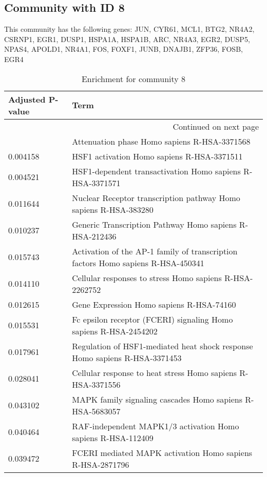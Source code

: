 \subsection*{Community with ID 8}
This community has the following genes: JUN, CYR61, MCL1, BTG2, NR4A2, CSRNP1, EGR1, DUSP1, HSPA1A, HSPA1B, ARC, NR4A3, EGR2, DUSP5, NPAS4, APOLD1, NR4A1, FOS, FOXF1, JUNB, DNAJB1, ZFP36, FOSB, EGR4
\\
\begin{longtable}{p{2.4cm}p{14.5cm}}
\caption{Enrichment for community 8}\\
\toprule
Adjusted \newline P-value &                                                                              Term \\
\midrule
\endhead
\midrule
\multicolumn{2}{r}{{Continued on next page}} \\
\midrule
\endfoot

\bottomrule
\endlastfoot
                 0.005931 &                                      Attenuation phase Homo sapiens R-HSA-3371568 \\
                 0.004158 &                                        HSF1 activation Homo sapiens R-HSA-3371511 \\
                 0.004521 &                         HSF1-dependent transactivation Homo sapiens R-HSA-3371571 \\
                 0.011644 &                  Nuclear Receptor transcription pathway Homo sapiens R-HSA-383280 \\
                 0.010237 &                           Generic Transcription Pathway Homo sapiens R-HSA-212436 \\
                 0.015743 &  Activation of the AP-1 family of transcription factors Homo sapiens R-HSA-450341 \\
                 0.014110 &                           Cellular responses to stress Homo sapiens R-HSA-2262752 \\
                 0.012615 &                                          Gene Expression Homo sapiens R-HSA-74160 \\
                 0.015531 &                  Fc epsilon receptor (FCERI) signaling Homo sapiens R-HSA-2454202 \\
                 0.017961 &        Regulation of HSF1-mediated heat shock response Homo sapiens R-HSA-3371453 \\
                 0.028041 &                       Cellular response to heat stress Homo sapiens R-HSA-3371556 \\
                 0.043102 &                         MAPK family signaling cascades Homo sapiens R-HSA-5683057 \\
                 0.040464 &                      RAF-independent MAPK1/3 activation Homo sapiens R-HSA-112409 \\
                 0.039472 &                         FCERI mediated MAPK activation Homo sapiens R-HSA-2871796 \\
\end{longtable}


